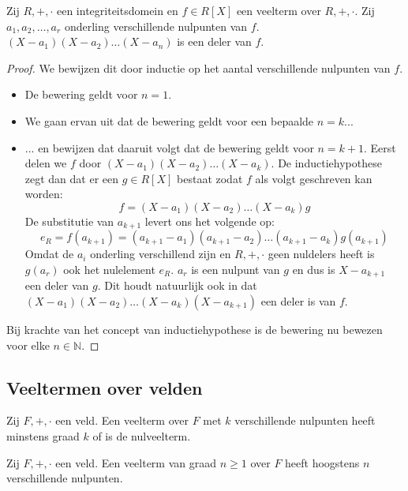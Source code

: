 \documentclass[main.tex]{subfiles}
\begin{document}
\begin{st}
  Zij $R,+,\cdot$ een integriteitsdomein en $f\in R[X]$ een veelterm over $R,+,\cdot$.
  Zij $a_{1},a_{2},\dotsc,a_{r}$ onderling verschillende nulpunten van $f$.
  $(X-a_{1})(X-a_{2}) \dotsc (X-a_{n})$ is een deler van $f$.

  \begin{proof}
    We bewijzen dit door inductie op het aantal verschillende nulpunten van $f$.
    \begin{itemize}
    \item De bewering geldt voor $n=1$.
    \item We gaan ervan uit dat de bewering geldt voor een bepaalde $n=k$...
    \item ... en bewijzen dat daaruit volgt dat de bewering geldt voor $n=k+1$.
      Eerst delen we $f$ door $(X-a_{1})(X-a_{2})\dotsc(X-a_{k})$.
      De inductiehypothese zegt dan dat er een $g\in R[X]$ bestaat zodat $f$ als volgt geschreven kan worden:
      \[ f = (X-a_{1})(X-a_{2})\dotsc(X-a_{k}) g \]
      De substitutie van $a_{k+1}$ levert ons het volgende op:
      \[ e_{R} = f(a_{k+1}) = (a_{k+1}-a_{1})(a_{k+1}-a_{2})\dotsc(a_{k+1}-a_{k})g(a_{k+1}) \]
      Omdat de $a_{i}$ onderling verschillend zijn en $R,+,\cdot$ geen nuldelers heeft is $g(a_{r})$ ook het nulelement $e_{R}$.
      $a_{r}$ is een nulpunt van $g$ en dus is $X-a_{k+1}$ een deler van $g$.
      Dit houdt natuurlijk ook in dat $(X-a_{1})(X-a_{2})\dotsc(X-a_{k})(X-a_{k+1})$ een deler is van $f$.
    \end{itemize}
    Bij krachte van het concept van inductiehypothese is de bewering nu bewezen voor elke $n\in \mathbb{N}$.
  \end{proof}
\end{st}

\subsection{Veeltermen over velden}
\label{sec:veelt-over-veld}

\begin{st}
  Zij $F,+,\cdot$ een veld.
  Een veelterm over $F$ met $k$ verschillende nulpunten heeft minstens graad $k$ of is de nulveelterm.
\end{st}
\begin{st}
  Zij $F,+,\cdot$ een veld.
  Een veelterm van graad $n \ge 1$ over $F$ heeft hoogstens $n$ verschillende nulpunten.
\end{st}
\end{document}

